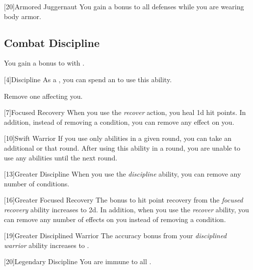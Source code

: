             [20]{Armored Juggernaut}
            You gain a  bonus to all defenses while you are wearing body armor.

        \subsection{Combat Discipline}

            You gain a  bonus to  with .

            [4]{Discipline} As a , you can spend an  to use this ability.
            \begin{ability}
                \begin{spelleffects}
                    \spelleffect Remove one  affecting you.
                \end{spelleffects}
            \end{ability}

            [7]{Focused Recovery}
            When you use the \textit{recover} action, you heal \plus1d hit points.
            In addition, instead of removing a condition, you can remove any  effect on you.

            [10]{Swift Warrior}
            If you use only  abilities in a given round, you can take an additional  or  that round.
            After using this ability in a round, you are unable to use any  abilities until the next round.

            [13]{Greater Discipline}
            When you use the \textit{discipline} ability, you can remove any number of conditions.

            [16]{Greater Focused Recovery}
            The bonus to hit point recovery from the \textit{focused recovery} ability increases to \plus2d.
            In addition, when you use the \textit{recover} ability, you can remove any number of  effects on you instead of removing a condition.

            [19]{Greater Disciplined Warrior}
            The accuracy bonus from your \textit{disciplined warrior} ability increases to .

            [20]{Legendary Discipline} 
            You are immune to all .

